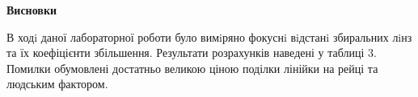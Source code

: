 \begin{center}
    \Large{\textbf{Висновки}}    
\end{center}

\vspace{1mm}

В ходi даної лабораторної роботи було вимiряно фокуснi 
вiдстанi збиральних лiнз та їх коефіцієнти збільшення.
Результати розрахунків наведені у таблиці 3.
Помилки обумовлені достатньо великою ціною поділки лінійки на рейці та
людським фактором.
